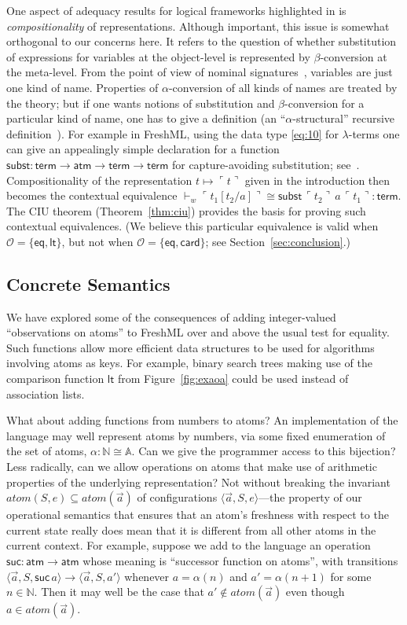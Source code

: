 \documentclass{LMCS}
\theoremstyle{plain}
\theoremstyle{definition}
\newcommand{\atm}[1][a]{#1}
\newcommand{\ATM}{\kw{atm}}
\newcommand{\Atom}{\mathbb{A}}
\newcommand{\atoms}{\mathit{atom}}
\newcommand{\bij}{\cong}
\newcommand{\config}[3]{\langle#1, #2, #3\rangle}
\newcommand{\ent}{\vdash}
\renewcommand{\exp}[1][e]{#1}
\newcommand{\FUNTY}{\mathbin{\rightarrow}}
\newcommand{\kw}[1]{\mathsf{#1}}
\newcommand{\NNO}{\mathbb{N}}
\newcommand{\Obs}{\mathcal{O}}
\newcommand{\OBS}[1][obs]{\kw{#1}}
\newcommand{\ofty}{:}
\newcommand{\OFTY}{\mathrel{\kw{:}}}
\newcommand{\opeq}{\cong}
\newcommand{\rep}[1]{\ulcorner#1\urcorner}
\newcommand{\s}[1][a]{\vec{#1}}
\newcommand{\stk}[1][S]{#1}
\newcommand{\sub}[2]{{[#2/#1]}}
\newcommand{\TERM}{\kw{term}}
\newcommand{\trans}{\longrightarrow}
\newcommand{\w}[1][w]{#1}
\begin{document}
One aspect of adequacy results for logical frameworks highlighted in
\cite{PfenningF:logf} is \emph{compositionality} of representations.
Although important, this issue is somewhat orthogonal to our concerns
here. It refers to the question of whether substitution of expressions
for variables at the object-level is represented by $\beta$-conversion
at the meta-level. From the point of view of nominal
signatures~\cite{PittsAM:alpsri}, variables are just one kind of name.
Properties of $\alpha$-conversion of all kinds of names are treated by
the theory; but if one wants notions of substitution and
$\beta$-conversion for a particular kind of name, one has to give a
definition (an ``$\alpha$-structural'' recursive
definition~\cite{PittsAM:alpsri}). For example in FreshML, using the
data type \eqref{eq:10} for $\lambda$-terms one can give an
appealingly simple declaration for a function $\kw{subst}\OFTY
\TERM\FUNTY\ATM\FUNTY\TERM\FUNTY\TERM$ for capture-avoiding
substitution; see~\cite[p.~264]{PittsAM:frepbm}.  Compositionality of
the representation $t\mapsto \rep{t}$ given in the introduction then
becomes the contextual equivalence ${}\ent_{\w}
\rep{t_1\sub{\atm}{t_2}} \opeq \kw{subst}\,\rep{t_2}\,\atm\,\rep{t_1}
\ofty\TERM$. The CIU theorem (Theorem~\ref{thm:ciu}) provides the
basis for proving such contextual equivalences. (We believe this
particular equivalence is valid when $\Obs=\{\OBS[eq],\OBS[lt]\}$, but
not when $\Obs=\{\OBS[eq],\OBS[card]\}$; see
Section~\ref{sec:conclusion}.)

\subsection{Concrete Semantics}
\label{sec:atoa}

We have explored some of the consequences of adding integer-valued
``observations on atoms'' to FreshML over and above the usual test
for equality.  Such functions allow more efficient data structures
to be used for algorithms involving atoms as keys. For example, binary
search trees making use of the comparison function $\OBS[lt]$ from
Figure~\ref{fig:exaoa} could be used instead of association lists.

What about adding functions from numbers to atoms?  An implementation
of the language may well represent atoms by numbers, via some fixed
enumeration of the set of atoms, $\alpha:\NNO\bij\Atom$.  Can we give
the programmer access to this bijection? Less radically, can we allow
operations on atoms that make use of arithmetic properties of the
underlying representation? Not without breaking the invariant
$\atoms(\stk,\exp)\subseteq\atoms(\s)$ of configurations
$\config{\s}{\stk}{\exp}$---the property of our operational semantics
that ensures that an atom's freshness with respect to the current
state really does mean that it is different from all other atoms in
the current context.  For example, suppose we add to the language an
operation $\OBS[suc]\OFTY\ATM\FUNTY\ATM$ whose meaning is ``successor
function on atoms'', with transitions
$\config{\s}{\stk}{\OBS[suc]\,\atm} \trans \config{\s}{\stk}{\atm'}$
whenever $\atm=\alpha(n)$ and $\atm'=\alpha(n+1)$ for some $n\in\NNO$.
Then it may well be the case that $\atm'\notin\atoms(\s)$ even though
$\atm\in\atoms(\s)$.
\end{document}
